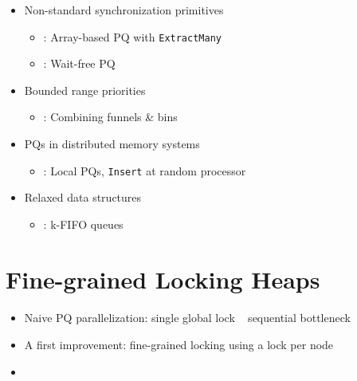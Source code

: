 \documentclass[usenames,dvipsnames]{beamer}
\begin{document}
\begin{frame}{}
\begin{itemize}
\item Non-standard synchronization primitives
    \begin{itemize}
    \item \citeauthor{liu2012lock}: Array-based PQ with \lstinline|ExtractMany|
    \item \citeauthor{israeli1993efficient}: Wait-free PQ
    \end{itemize}

\item Bounded range priorities
    \begin{itemize}
    \item \citeauthor{shavit1999scalable}: Combining funnels \& bins
    \end{itemize}

\item PQs in distributed memory systems
    \begin{itemize}
    \item \citeauthor{sanders1998randomized}: Local PQs, \lstinline|Insert| at random processor
    \end{itemize}

\item Relaxed data structures
    \begin{itemize}
    \item \citeauthor{kirsch2012fast}: k-FIFO queues
    \end{itemize}

\end{itemize}
\end{frame}

\section{Fine-grained Locking Heaps} \label{sec:locking}

\begin{frame}{}
\framesubtitle{\citeauthor{hunt1996efficient}}

\begin{itemize}
\item Naive PQ parallelization: single global lock \textrightarrow ~ sequential bottleneck
\item A first improvement: fine-grained locking using a lock per node
\item {}
\end{itemize}
\end{frame}
\end{document}

